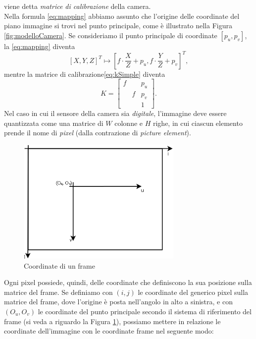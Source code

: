 viene detta \textit{matrice di calibrazione} della camera.\\
Nella formula \eqref{eq:mapping} abbiamo assunto che l'origine delle coordinate del piano immagine si trovi nel punto principale, come \`e illustrato nella Figura \ref{fig:modelloCamera}.
Se consideriamo il punto principale di coordinate $[p_u, p_v]$, la \eqref{eq:mapping} diventa
 \begin{equation}
 \label{eq:mappingGeneral}
 [X,Y,Z]^\textit{T} \mapsto \left[f\cdot \frac{X}{Z}+p_u, f\cdot \frac{Y}{Z}+p_v\right]^\textit{T},
 \end{equation}
 mentre la matrice di calibrazione\eqref{eq:kSimple} diventa 
 \begin{equation}
 \label{eq:kGeneral}
 K =
  \left[\begin{array}{rcl}
  f & & p_u \\
  & f & p_v \\
  & & 1 
  \end{array}\right].
 \end{equation}
 Nel caso in cui il sensore della camera sia \textit{digitale}, l'immagine deve essere quantizzata come una matrice di $W$ colonne e $H$ righe, in cui ciascun elemento prende il nome di \textit{pixel} (dalla contrazione di \textit{picture element}).
 \begin{figure}[tb]
 	\centering
 	\includegraphics[width=8cm]{./pictures/griglia}
 	\caption{Coordinate di un frame}
 	\label{fig:griglia}
 \end{figure}
 Ogni pixel possiede, quindi, delle coordinate che definiscono la sua posizione sulla matrice del frame.
 Se definiamo con $(i,j)$ le coordinate del generico pixel sulla matrice del frame, dove l'origine \`e posta nell'angolo in alto a sinistra, e con $(O_u, O_v)$ le coordinate del punto principale secondo il sistema di riferimento del frame (si veda a riguardo la Figura \ref{fig:griglia}), possiamo mettere in relazione le coordinate dell'immagine con le coordinate frame nel seguente modo:
